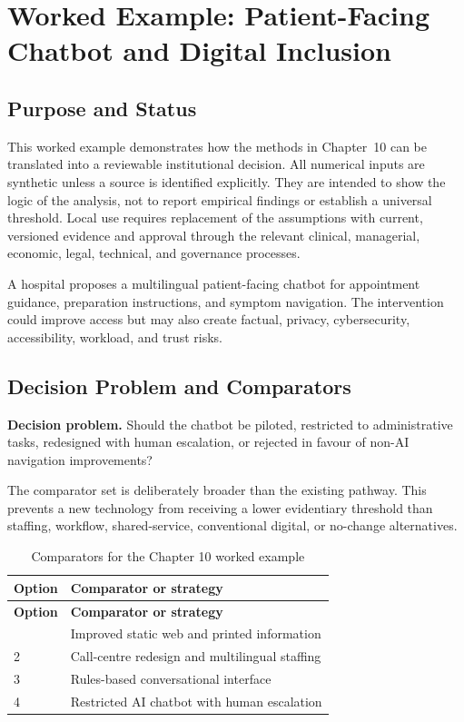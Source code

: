 \section{Worked Example: Patient-Facing Chatbot and Digital Inclusion}
\label{sec:comp-ch10-worked-example}

\subsection{Purpose and Status}
This worked example demonstrates how the methods in Chapter~10 can be
translated into a reviewable institutional decision. All numerical inputs are
synthetic unless a source is identified explicitly. They are intended to show the
logic of the analysis, not to report empirical findings or establish a universal
threshold. Local use requires replacement of the assumptions with current,
versioned evidence and approval through the relevant clinical, managerial,
economic, legal, technical, and governance processes.

A hospital proposes a multilingual patient-facing chatbot for appointment guidance, preparation instructions, and symptom navigation. The intervention could improve access but may also create factual, privacy, cybersecurity, accessibility, workload, and trust risks. 

\subsection{Decision Problem and Comparators}
\textbf{Decision problem.} Should the chatbot be piloted, restricted to administrative tasks, redesigned with human escalation, or rejected in favour of non-AI navigation improvements?

The comparator set is deliberately broader than the existing pathway. This prevents
a new technology from receiving a lower evidentiary threshold than staffing,
workflow, shared-service, conventional digital, or no-change alternatives.

\begin{longtable}{@{}p{}p{}@{}}
\caption{Comparators for the Chapter 10 worked example}
\label{tab:comp-ch10-comparators}\\
\toprule
\textbf{Option} & \textbf{Comparator or strategy} \\
\midrule
\endfirsthead
\toprule
\textbf{Option} & \textbf{Comparator or strategy} \\
\midrule
\endhead
\bottomrule
\endlastfoot
1 & Improved static web and printed information \\
2 & Call-centre redesign and multilingual staffing \\
3 & Rules-based conversational interface \\
4 & Restricted AI chatbot with human escalation \\
\end{longtable}

